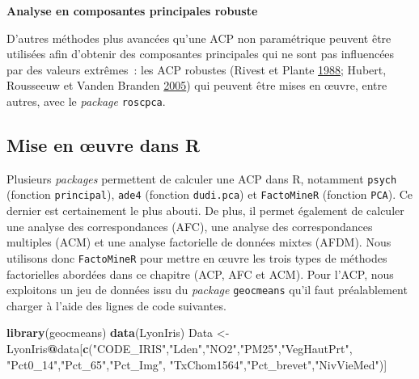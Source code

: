 \documentclass[
  11pt,
  french,
]{book}
\makeatletter
\newenvironment{Shaded}{\begin{snugshade}}{\end{snugshade}}
\newcommand{\KeywordTok}[1]{\textcolor[rgb]{0.13,0.29,0.53}{\textbf{#1}}}
\newcommand{\NormalTok}[1]{#1}
\newcommand{\OperatorTok}[1]{\textcolor[rgb]{0.81,0.36,0.00}{\textbf{#1}}}
\newcommand{\StringTok}[1]{\textcolor[rgb]{0.31,0.60,0.02}{#1}}
\newenvironment{kframe}{%
\medskip{}
\setlength{\fboxsep}{.8em}
 \def\at@end@of@kframe{}%
 \ifinner\ifhmode%
  \def\at@end@of@kframe{\end{minipage}}%
  \begin{minipage}{\columnwidth}%
 \fi\fi%
 \def\FrameCommand##1{\hskip\@totalleftmargin \hskip-\fboxsep
 \colorbox{shadecolor}{##1}\hskip-\fboxsep
     \hskip-\linewidth \hskip-\@totalleftmargin \hskip\columnwidth}%
 \MakeFramed {\advance\hsize-\width
   \@totalleftmargin\z@ \linewidth\hsize
   \@setminipage}}%
 {\par\unskip\endMakeFramed%
 \at@end@of@kframe}
\newenvironment{kframev}{%
\medskip{}
\setlength{\fboxsep}{.8em}
 \def\at@end@of@kframev{}%
 \ifinner\ifhmode%
  \def\at@end@of@kframev{\end{minipage}}%
  \begin{minipage}{\columnwidth}%
 \fi\fi%
 \def\FrameCommand##1{\hskip\@totalleftmargin \hskip-\fboxsep
 \colorbox{shadebluecolor}{##1}\hskip-\fboxsep
     \hskip-\linewidth \hskip-\@totalleftmargin \hskip\columnwidth}%
 \MakeFramed {\advance\hsize-\width
   \@totalleftmargin\z@ \linewidth\hsize
   \@setminipage}}%
 {\par\unskip\endMakeFramed%
 \at@end@of@kframev}
\renewenvironment{Shaded}{\begin{kframe}}{\end{kframe}}
\newenvironment{rmdblock}[1]
  {
  \begin{itemize}
  \renewcommand{\labelitemi}{
    \raisebox{-.7\height}[0pt][0pt]{
      {\setkeys{Gin}{width=3em,keepaspectratio}\texttt{[image: images/\#1]}}
    }
  }
  \setlength{\fboxsep}{1em}
  \begin{kframev}
  \small
  \item
  }
  {
  \end{kframev}
  \end{itemize}
  }
\newenvironment{bloc_aller_loin}
  {\begin{rmdblock}{aller_loin}}
  {\end{rmdblock}}
\makeatother
\begin{document}
\begin{bloc_aller_loin}
\textbf{Analyse en composantes principales robuste}

D'autres méthodes plus avancées qu'une ACP non paramétrique peuvent être utilisées afin d'obtenir des composantes principales qui ne sont pas influencées par des valeurs extrêmes~: les ACP robustes (Rivest et Plante \protect\hyperlink{ref-rivest1988analyse}{1988}; Hubert, Rousseeuw et Vanden Branden \protect\hyperlink{ref-hubert2005robpca}{2005}) qui peuvent être mises en œuvre, entre autres, avec le \emph{package} \texttt{roscpca}.

\end{bloc_aller_loin}

\hypertarget{sect1223}{%
\subsection{Mise en œuvre dans R}\label{sect1223}}

Plusieurs \emph{packages} permettent de calculer une ACP dans R, notamment \texttt{psych} (fonction \texttt{principal}), \texttt{ade4} (fonction \texttt{dudi.pca}) et \texttt{FactoMineR} (fonction \texttt{PCA}). Ce dernier est certainement le plus abouti. De plus, il permet également de calculer une analyse des correspondances (AFC), une analyse des correspondances multiples (ACM) et une analyse factorielle de données mixtes (AFDM). Nous utilisons donc \texttt{FactoMineR} pour mettre en œuvre les trois types de méthodes factorielles abordées dans ce chapitre (ACP, AFC et ACM). Pour l'ACP, nous exploitons un jeu de données issu du \emph{package} \texttt{geocmeans} qu'il faut préalablement charger à l'aide des lignes de code suivantes.

\begin{Shaded}
\begin{Highlighting}[]
\KeywordTok{library}\NormalTok{(geocmeans)}
\KeywordTok{data}\NormalTok{(LyonIris)}
\NormalTok{Data <-}\StringTok{ }\NormalTok{LyonIris}\OperatorTok{@}\NormalTok{data[}\KeywordTok{c}\NormalTok{(}\StringTok{"CODE_IRIS"}\NormalTok{,}\StringTok{"Lden"}\NormalTok{,}\StringTok{"NO2"}\NormalTok{,}\StringTok{"PM25"}\NormalTok{,}\StringTok{"VegHautPrt"}\NormalTok{,}
                        \StringTok{"Pct0_14"}\NormalTok{,}\StringTok{"Pct_65"}\NormalTok{,}\StringTok{"Pct_Img"}\NormalTok{,}
                        \StringTok{"TxChom1564"}\NormalTok{,}\StringTok{"Pct_brevet"}\NormalTok{,}\StringTok{"NivVieMed"}\NormalTok{)]}
\end{Highlighting}
\end{Shaded}
\end{document}

